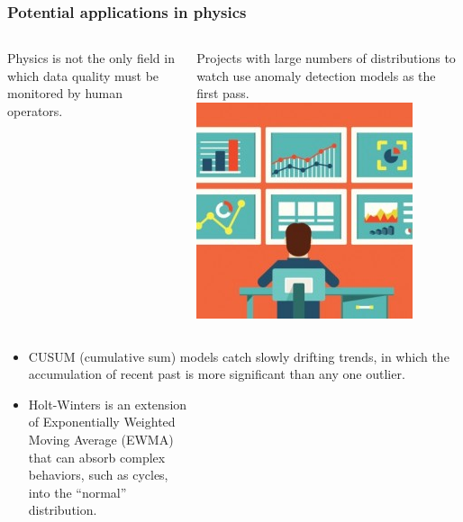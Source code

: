 \documentclass[compress]{beamer}
\begin{document}
\begin{frame}
\frametitle{Potential applications in physics}

\begin{columns}
Physics is not the only field in which data quality must be monitored by human operators.

\vspace{0.1 cm}
Projects with large numbers of distributions to watch use anomaly detection models as the first pass.
\includegraphics[width=\linewidth]{PLOTS/data_quality_monitoring.jpg}
\end{columns}

\begin{itemize}
\item CUSUM (cumulative sum) models catch slowly drifting trends, in which the accumulation of recent past is more significant than any one outlier.

\item Holt-Winters is an extension \\ of Exponentially Weighted \\ Moving Average (EWMA) \\ that can absorb complex \\ behaviors, such as cycles, \\ into the ``normal'' \\ distribution.
\end{itemize}


\end{frame}
\end{document}
